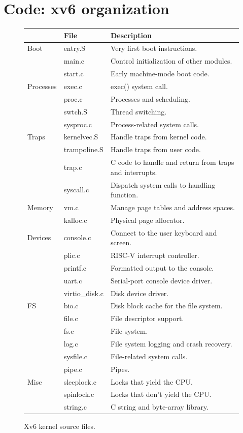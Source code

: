 \section{Code: xv6 organization}

\begin{figure}[t]
\center
\begin{tabular}{l|l|l}
& {\bf File} & {\bf Description} \\
\midrule
Boot & entry.S & Very first boot instructions.
 \\
 & main.c & Control initialization of other modules. \\
 & start.c & Early machine-mode boot code.
 \\
Processes & exec.c & exec() system call. \\
 & proc.c & Processes and scheduling. \\
 & swtch.S & Thread switching.
 \\
 & sysproc.c & Process-related system calls. \\
Traps & kernelvec.S & Handle traps from kernel code.
 \\
 & trampoline.S & Handle traps from user code. \\
 & trap.c & C code to handle and return from traps and interrupts.
 \\
 & syscall.c & Dispatch system calls to handling function. \\
Memory & vm.c & Manage page tables and address spaces.
 \\
 & kalloc.c & Physical page allocator. \\
Devices & console.c & Connect to the user keyboard and screen.
 \\
 & plic.c & RISC-V interrupt controller. \\
 & printf.c & Formatted output to the console.
 \\
 & uart.c & Serial-port console device driver. \\
 & virtio\_disk.c & Disk device driver.
 \\
FS & bio.c & Disk block cache for the file system. \\
 & file.c & File descriptor support.
 \\
 & fs.c & File system. \\
 & log.c & File system logging and crash recovery.
 \\
 & sysfile.c & File-related system calls. \\
 & pipe.c & Pipes.
 \\
Misc & sleeplock.c & Locks that yield the CPU. \\
 & spinlock.c & Locks that don't yield the CPU.
 \\
 & string.c & C string and byte-array library. \\
\end{tabular}
\caption{Xv6 kernel source files.}
\label{fig:source}
\end{figure}


